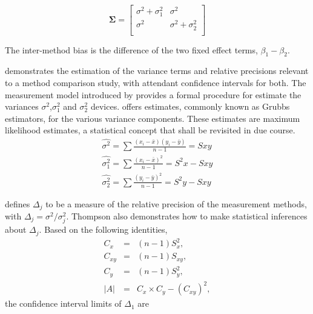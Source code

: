 \documentclass[12pt, a4paper]{report}
\theoremstyle{plain}
\theoremstyle{definition}
\theoremstyle{remark}
\begin{document}
	\[
	\boldsymbol{\Sigma} = \left[
	\begin{array}{cc}
	\sigma^{2} + \sigma^{2}_{1} & \sigma^{2} \\
	\sigma^{2} & \sigma^{2} + \sigma^{2}_{2} \\
	\end{array}
	\right]
	\]
	
	The inter-method bias is the difference of the two fixed effect terms, $\beta_{1}-\beta_{2}$.
	
	\citet{Kinsella} demonstrates the estimation of the variance terms and relative precisions relevant to a method comparison study, with attendant confidence intervals for both. The measurement model introduced by \citet{Grubbs48,Grubbs73} provides a formal procedure for estimate the variances $\sigma^2$,$\sigma^2_{1}$ and $\sigma^2_{2}$ devices. \citet{Grubbs48} offers estimates, commonly known as Grubbs estimators, for the various variance components. These estimates are maximum likelihood estimates, a statistical concept that shall be revisited in due course.
	\begin{eqnarray*}
		\hat{\sigma^{2}} = \sum{\frac{(x_{i}-\bar{x})(y_{i}-\bar{y})}{n-1}} = Sxy\\
		\hat{\sigma^{2}_{1}} = \sum{\frac{(x_{i}-\bar{x})^{2}}{n-1}} =S^{2}x - Sxy  \\
		\hat{\sigma^{2}_{2}} =
		\sum{\frac{(y_{i}-\bar{y})^{2}}{n-1}} = S^{2}y - Sxy
	\end{eqnarray*}
	
	
	\citet{Thompson} defines $\Delta_{j}$ to be a measure of the
	relative precision of the measurement methods, with $\Delta_{j}=
	\sigma^2/\sigma^2_{j}$. Thompson also demonstrates how to make statistical inferences about $\Delta_{j}$.
	Based on the following identities,
	\begin{eqnarray*}
		C_{x}&=&(n-1)S^2_{x},\nonumber\\
		C_{xy}&=&(n-1)S_{xy},\nonumber\\
		C_{y}&=&(n-1)S^2_{y},\nonumber\\
		|A| &=& C_{x}\times C_{y} - (C_{xy})^2,\nonumber
	\end{eqnarray*}
	\noindent the confidence interval limits of $\Delta_{1}$ are
	
\end{document}
